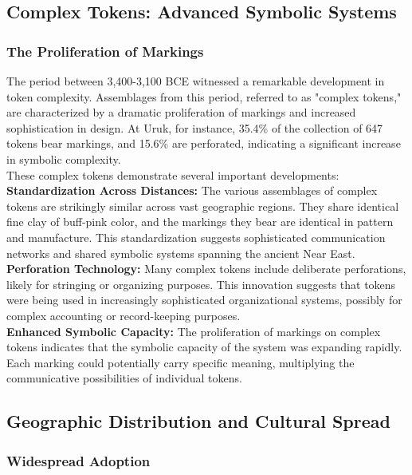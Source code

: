 \documentclass[12pt, oneside, openany]{book}
\begin{document}
\subsection{Complex Tokens: Advanced Symbolic Systems}

\subsubsection{The Proliferation of Markings}

The period between 3,400-3,100 BCE witnessed a remarkable development in token complexity. Assemblages from this period, referred to as "complex tokens," are characterized by a dramatic proliferation of markings and increased sophistication in design. At Uruk, for instance, 35.4\% of the collection of 647 tokens bear markings, and 15.6\% are perforated, indicating a significant increase in symbolic complexity.\\
These complex tokens demonstrate several important developments:
\textbf{Standardization Across Distances:} The various assemblages of complex tokens are strikingly similar across vast geographic regions. They share identical fine clay of buff-pink color, and the markings they bear are identical in pattern and manufacture. This standardization suggests sophisticated communication networks and shared symbolic systems spanning the ancient Near East.\\
\textbf{Perforation Technology:} Many complex tokens include deliberate perforations, likely for stringing or organizing purposes. This innovation suggests that tokens were being used in increasingly sophisticated organizational systems, possibly for complex accounting or record-keeping purposes.\\
\textbf{Enhanced Symbolic Capacity:} The proliferation of markings on complex tokens indicates that the symbolic capacity of the system was expanding rapidly. Each marking could potentially carry specific meaning, multiplying the communicative possibilities of individual tokens.
\subsection{Geographic Distribution and Cultural Spread}

\subsubsection{Widespread Adoption}
\end{document}
